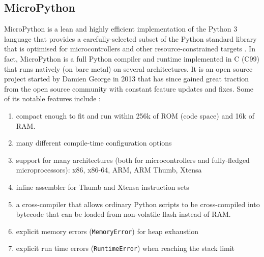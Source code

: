 \subsection{MicroPython}
MicroPython is a lean and highly efficient implementation of the Python 3 language that provides a carefully-selected subset of the Python standard library that is optimised for microcontrollers and other resource-constrained targets \cite{micropython}. In fact, MicroPython is a full Python compiler and runtime implemented in C (C99) that runs natively (on bare metal) on several architectures. It is an open source project started by Damien George in 2013 that has since gained great traction from the open source community with constant feature updates and fixes. Some of its notable features include \cite{micropython}: 
\begin{enumerate}
    \item compact enough to fit and run within 256k of ROM (code space) and 16k of RAM.
    \item many different compile-time configuration options
    \item support for many architectures (both for microcontrollers and fully-fledged microprocessors): x86, x86-64, ARM, ARM Thumb, Xtensa
    \item inline assembler for Thumb and Xtensa instruction sets
    \item a cross-compiler that allows ordinary Python scripts to be cross-compiled into bytecode that can be loaded from non-volatile flash instead of RAM.
    \item explicit memory errors (\texttt{MemoryError}) for heap exhaustion
    \item explicit run time errors (\texttt{RuntimeError}) when reaching the stack limit
\end{enumerate}

